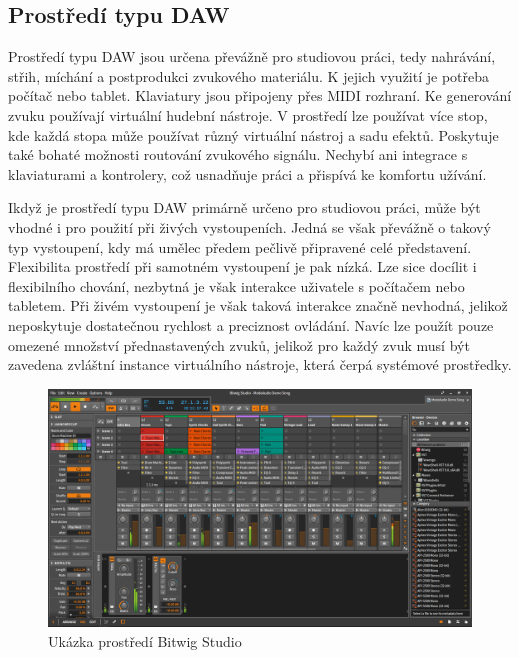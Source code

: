 \documentclass[thesis=M,czech]{FITthesis}[2019/03/06]
\begin{document}
		\subsection{Prostředí typu DAW}
			Prostředí typu DAW jsou určena převážně pro studiovou práci, tedy nahrávání, střih, míchání a postprodukci zvukového materiálu.
			K jejich využití je potřeba počítač nebo tablet. Klaviatury jsou připojeny přes MIDI rozhraní. Ke generování zvuku používají virtuální hudební nástroje.
			V prostředí lze používat více stop, kde každá stopa může používat různý virtuální nástroj a sadu efektů.
			Poskytuje také bohaté možnosti routování zvukového signálu.
			Nechybí ani integrace s klaviaturami a kontrolery, což usnadňuje práci a přispívá ke komfortu užívání.
			
			Ikdyž je prostředí typu DAW primárně určeno pro studiovou práci, může být vhodné i pro použití při živých vystoupeních.
			Jedná se však převážně o takový typ vystoupení, kdy má umělec předem pečlivě připravené celé představení.
			Flexibilita prostředí při samotném vystoupení je pak nízká.
			Lze sice docílit i flexibilního chování, nezbytná je však interakce uživatele s počítačem nebo tabletem. Při živém vystoupení
			je však taková interakce značně nevhodná, jelikož neposkytuje dostatečnou rychlost a preciznost ovládání.
			Navíc lze použít pouze omezené množství přednastavených zvuků, jelikož pro každý zvuk musí být zavedena zvláštní instance
			virtuálního nástroje, která čerpá systémové prostředky.
			
			\begin{figure}[H]
				\centering
				\includegraphics[width=1\textwidth]{DAW}
				\caption{Ukázka prostředí Bitwig Studio}\label{fig:DAW}
			\end{figure}
			
\clearpage
\end{document}
